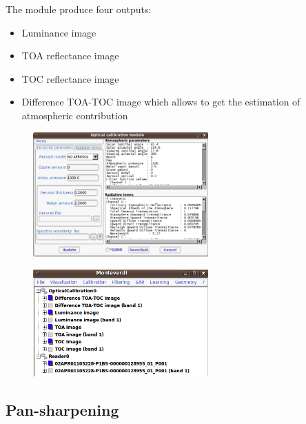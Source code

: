 The module produce four outputs:

\begin{itemize}
\item Luminance image
\item TOA reflectance image
\item TOC reflectance image
\item Difference TOA-TOC image which allows to get the estimation of atmospheric contribution
\end{itemize}

\begin{figure}
  \center
  \includegraphics[width=0.6\textwidth]{../Art/MonteverdiImages/monteverdi_optical_calibration.png}
  \label{fig:opticalcalibration}
\end{figure}


\begin{figure}
  \center
  \includegraphics[width=0.6\textwidth]{../Art/MonteverdiImages/monteverdi_optical_calibration_outputs.png}
  \label{fig:opticalcalibrationoutput}
\end{figure}

\subsection{Pan-sharpening}\label{ssec:pxs}

